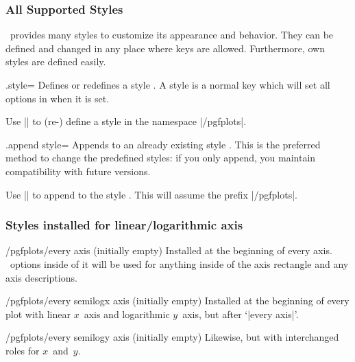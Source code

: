 \subsubsection{All Supported Styles}
\PGFPlots\ provides many styles to customize its appearance and behavior. They can be defined and changed in any place where keys are allowed. Furthermore, own styles are defined easily.

\begin{handler}{{.style}=}
	Defines or redefines a style . A style is a normal key which will set all options in  when it is set.

	Use	|| to (re-) define a style  in the namespace |/pgfplots|.
\end{handler}

\begin{handler}{{.append style}=}
	Appends  to an already existing style . This is the preferred method to change the predefined styles: if you only append, you maintain compatibility with future versions.

	Use	|| to append  to the style . This will assume the prefix |/pgfplots|.
\end{handler}

\subsubsection*{Styles installed for linear/logarithmic axis}

\begin{stylekey}{/pgfplots/every axis (initially empty)}
 Installed at the beginning of every axis. \Tikz\ options inside of it will be used for anything inside of the axis rectangle and any axis descriptions.
\end{stylekey}

\begin{stylekey}{/pgfplots/every semilogx axis (initially empty)}
 Installed at the beginning of every plot with linear $x$~axis and logarithmic $y$~axis, but after `|every axis|'.
\end{stylekey}

\begin{stylekey}{/pgfplots/every semilogy axis (initially empty)}
 Likewise, but with interchanged roles for $x$~and~$y$.
\end{stylekey}

